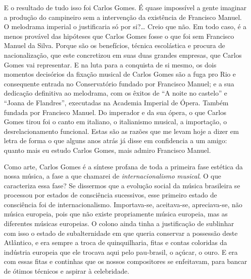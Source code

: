 E o resultado de tudo isso foi Carlos Gomes. É quase impossível a gente
imaginar a produção do campineiro sem a intervenção da existência de
Francisco Manuel. O melodrama imperial o justificaria só por si?\ldots{}
Creio que não. Em todo caso, é a menos provável das hipóteses que Carlos
Gomes fosse o que foi sem Francisco Manuel da Silva. Porque são os
benefícios, técnica escolástica e procura de nacionalização, que este
concretizou em suas duas grandes empresas, que Carlos Gomes vai
representar. E na luta para a conquista de si mesmo, os dois momentos
decisórios da fixação musical de Carlos Gomes são a fuga pro Rio e
consequente entrada no Conservatório fundado por Francisco Manuel; e a
sua dedicação definitiva ao melodrama, com os êxitos de ``A noite no
castelo'' e ``Joana de Flandres'', executadas na Academia Imperial de Ópera.
Também fundada por Francisco Manuel. Do imperador e da sua ópera, o que
Carlos Gomes tirou foi o canto em italiano, o italianismo musical, a
importação, o desrelacionamento funcional. Estas são as razões que me
levam hoje a dizer em letra de forma o que alguns anos atrás já disse em
confidencia a um amigo: quanto mais eu estudo Carlos Gomes, mais admiro
Francisco Manuel.

Como arte, Carlos Gomes é a síntese profana de toda a primeira fase
estética da nossa música, a fase a que chamarei de \textit{internacionalismo
musical}. O que caracteriza essa fase? Se dissermos que a evolução
social da música brasileira se processou por estados de consciência
sucessivos, esse primeiro estado de consciência foi de
internacionalismo. Importava-se, aceitava-se, apreciava-se, não música
europeia, pois que não existe propriamente música europeia, mas as
diferentes músicas europeias. O colono ainda tinha a justificação de
sublinhar com isso o estado de subalternidade em que queria conservar a
possessão deste Atlântico, e era sempre a troca de quinquilharia, fitas
e contas coloridas da indústria europeia que ele trocava aqui pelo
pau-brasil, o açúcar, o ouro. E era com essas fitas e continhas que os
nossos compositores se enfeitavam, para bancar de ótimos técnicos e
aspirar à celebridade.

